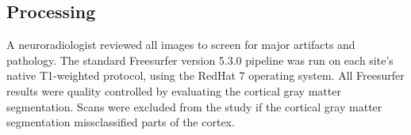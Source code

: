 \subsection{Processing}
 A neuroradiologist reviewed all images to screen for major artifacts and pathology. The standard Freesurfer\cite{freesurferPaper} version 5.3.0 pipeline was run on each site's native T1-weighted protocol, using the RedHat 7 operating system. All Freesurfer results were quality controlled by evaluating the cortical gray matter segmentation. Scans were excluded from the study if the cortical gray matter segmentation missclassified parts of the cortex.